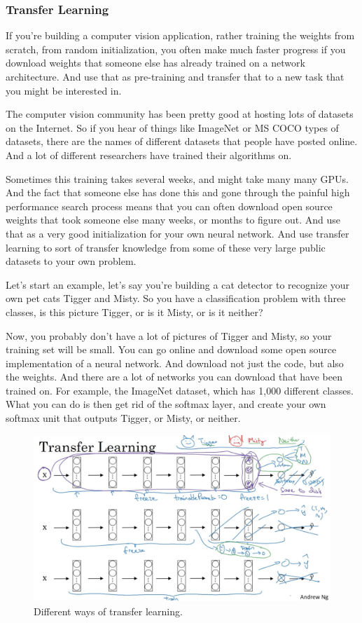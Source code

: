 \documentclass[UTF8]{article}
\begin{document}
\subsubsection{Transfer Learning}
If you're building a computer vision application, rather training the weights from scratch, from
random initialization, you often make much faster progress if you download weights that someone
else has already trained on a network architecture. And use that as pre-training and transfer that
to a new task that you might be interested in.

The computer vision community has been pretty good at hosting lots of datasets on the Internet. So
if you hear of things like ImageNet or MS COCO types of datasets, there are the names of different
datasets that people have posted online. And a lot of different researchers have trained their
algorithms on.

Sometimes this training takes several weeks, and might take many many GPUs. And the fact that
someone else has done this and gone through the painful high performance search process means that
you can often download open source weights that took someone else many weeks, or months to figure
out. And use that as a very good initialization for your own neural network. And use transfer
learning to sort of transfer knowledge from some of these very large public datasets to your own
problem.

Let's start an example, let's say you're building a cat detector to recognize your own pet cats
Tigger and Misty. So you have a classification problem with three classes, is this picture Tigger,
or is it Misty, or is it neither?

Now, you probably don't have a lot of pictures of Tigger and Misty, so your training set will be
small. You can go online and download some open source implementation of a neural network. And
download not just the code, but also the weights. And there are a lot of networks you can download
that have been trained on. For example, the ImageNet dataset, which has 1,000 different classes.
What you can do is then get rid of the softmax layer, and create your own softmax unit that outputs
Tigger, or Misty, or neither.

\begin{figure}[htb]
    \centering
    \includegraphics[width=40em]{figures/transfer-learning}
    \caption{Different ways of transfer learning.}
    \label{fig:transfer-learning}
\end{figure}
\end{document}
